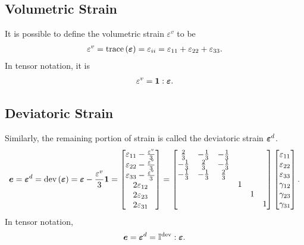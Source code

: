 \subsection{Volumetric Strain}
It is possible to define the volumetric strain $\varepsilon^v$ to be
\begin{gather}
\varepsilon^v=\text{trace}\left(\bm{\varepsilon}\right)=\varepsilon_{ii}=\varepsilon_{11}+\varepsilon_{22}+\varepsilon_{33}.
\end{gather}
In tensor notation, it is
\begin{gather}
\varepsilon^v=\bm{1}:\bm{\varepsilon}.
\end{gather}
\subsection{Deviatoric Strain}
Similarly, the remaining portion of strain is called the deviatoric strain $\bm{\varepsilon}^d$.
\begin{gather}
\bm{e}=\bm{\varepsilon}^d=\text{dev}\left(\bm{\varepsilon}\right)=\bm{\varepsilon}-\dfrac{\varepsilon^v}{3}\bm{1}=\begin{bmatrix}
\varepsilon_{11}-\frac{\varepsilon^v}{3}\\\varepsilon_{22}-\frac{\varepsilon^v}{3}\\\varepsilon_{33}-\frac{\varepsilon^v}{3}\\2\varepsilon_{12}\\2\varepsilon_{23}\\2\varepsilon_{31}
\end{bmatrix}=\begin{bmatrix}
\frac{2}{3}&-\frac{1}{3}&-\frac{1}{3}&&&\\
-\frac{1}{3}&\frac{2}{3}&-\frac{1}{3}&&&\\
-\frac{1}{3}&-\frac{1}{3}&\frac{2}{3}&&&\\
&&&1&&\\
&&&&1&\\
&&&&&1
\end{bmatrix}\begin{bmatrix}
\varepsilon_{11}\\\varepsilon_{22}\\\varepsilon_{33}\\\gamma_{12}\\\gamma_{23}\\\gamma_{31}
\end{bmatrix}.
\end{gather}
In tensor notation,
\begin{gather}
\bm{e}=\bm{\varepsilon}^d=\mathbb{I}^\text{dev}:\bm{\varepsilon}.
\end{gather}
